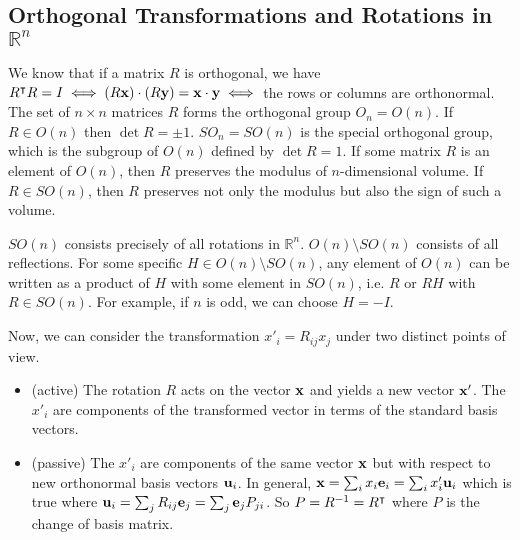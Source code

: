 \subsection{Orthogonal Transformations and Rotations in \(\mathbb R^n\)}
We know that if a matrix \(R\) is orthogonal, we have \(R^\intercal R = I \iff (R\vb x) \cdot (R\vb y) = \vb x \cdot \vb y \iff\) the rows or columns are orthonormal. The set of \(n \times n\) matrices \(R\) forms the orthogonal group \(O_n = O(n)\). If \(R \in O(n)\) then \(\det R = \pm 1\). \(SO_n = SO(n)\) is the special orthogonal group, which is the subgroup of \(O(n)\) defined by \(\det R = 1\). If some matrix \(R\) is an element of \(O(n)\), then \(R\) preserves the modulus of \(n\)-dimensional volume. If \(R \in SO(n)\), then \(R\) preserves not only the modulus but also the sign of such a volume.

\(SO(n)\) consists precisely of all rotations in \(\mathbb R^n\). \(O(n) \setminus SO(n)\) consists of all reflections. For some specific \(H \in O(n) \setminus SO(n)\), any element of \(O(n)\) can be written as a product of \(H\) with some element in \(SO(n)\), i.e. \(R\) or \(RH\) with \(R \in SO(n)\). For example, if \(n\) is odd, we can choose \(H = -I\).

Now, we can consider the transformation \(x'_i = R_{ij} x_j\) under two distinct points of view.
\begin{itemize}
	\item (active) The rotation \(R\) acts on the vector \(\vb x\) and yields a new vector \(\vb x'\). The \(x'_i\) are components of the transformed vector in terms of the standard basis vectors.
	\item (passive) The \(x'_i\) are components of the same vector \(\vb x\) but with respect to new orthonormal basis vectors \(\vb u_i\). In general, \(\vb x = \sum_i x_i \vb e_i = \sum_i x'_i \vb u_i\) which is true where \(\vb u_i = \sum_j R_{ij} \vb e_j = \sum_j \vb e_j P_{ji}\). So \(P = R^{-1} = R^\intercal\) where \(P\) is the change of basis matrix.
\end{itemize}

